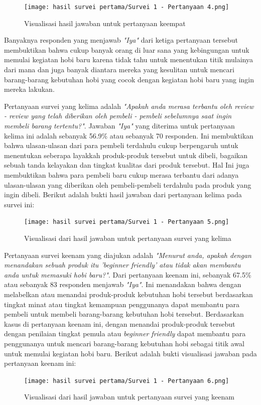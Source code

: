 \documentclass[a4paper]{article}
\begin{document}
\begin{figure}[h]
    \centering
    \texttt{[image: hasil survei pertama/Survei 1 - Pertanyaan 4.png]}
    \caption{Visualisasi hasil jawaban untuk pertanyaan keempat}
\end{figure}
\newpage

Banyaknya responden yang menjawab \textit{"Iya"} dari ketiga pertanyaan tersebut membuktikan bahwa cukup banyak orang di luar sana yang kebingungan untuk memulai kegiatan hobi baru karena tidak tahu untuk menentukan titik mulainya dari mana dan juga banyak diantara mereka yang kesulitan untuk mencari barang-barang kebutuhan hobi yang cocok dengan kegiatan hobi baru yang ingin mereka lakukan.

Pertanyaan survei yang kelima adalah \textit{"Apakah anda merasa terbantu oleh review - review yang telah diberikan oleh pembeli - pembeli sebelumnya saat ingin membeli barang tertentu?"}. Jawaban \textit{"Iya"} yang diterima untuk pertanyaan kelima ini adalah sebanyak 56.9\% atau sebanyak 70 responden. Ini membuktikan bahwa ulasan-ulasan dari para pembeli terdahulu cukup berpengaruh untuk menentukan seberapa layakkah produk-produk tersebut untuk dibeli, bagaikan sebuah tanda kelayakan dan tingkat kualitas dari produk tersebut. Hal Ini juga membuktikan bahwa para pembeli baru cukup merasa terbantu dari adanya ulasan-ulasan yang diberikan oleh pembeli-pembeli terdahulu pada produk yang ingin dibeli. Berikut adalah bukti hasil jawaban dari pertanyaan kelima pada survei ini:

\begin{figure}[h]
    \centering
    \texttt{[image: hasil survei pertama/Survei 1 - Pertanyaan 5.png]}
    \caption{Visualisasi dari hasil jawaban untuk pertanyaan survei yang kelima}
\end{figure}

Pertanyaan survei keenam yang diajukan adalah \textit{"Menurut anda, apakah dengan menandakan sebuah produk itu 'beginner friendly' atau tidak akan membantu anda untuk memasuki hobi baru?"}. Dari pertanyaan keenam ini, sebanyak 67.5\% atau sebanyak 83 responden menjawab \textit{"Iya"}. Ini menandakan bahwa dengan melabelkan atau menandai produk-produk kebutuhan hobi tersebut berdasarkan tingkat minat atau tingkat kemampuan penggunanya dapat membantu para pembeli untuk membeli barang-barang kebutuhan hobi tersebut. Berdasarkan kasus di pertanyaan keenam ini, dengan menandai produk-produk tersebut dengan penilaian tingkat pemula atau \textit{beginner friendly} dapat membantu para penggunanya untuk mencari barang-barang kebutuhan hobi sebagai titik awal untuk memulai kegiatan hobi baru. Berikut adalah bukti visualisasi jawaban pada pertanyaan keenam ini:
\newpage
\begin{figure}[h]
    \centering
    \texttt{[image: hasil survei pertama/Survei 1 - Pertanyaan 6.png]}
    \caption{Visualisasi dari hasil jawaban untuk pertanyaan survei yang keenam}
\end{figure}
\end{document}
